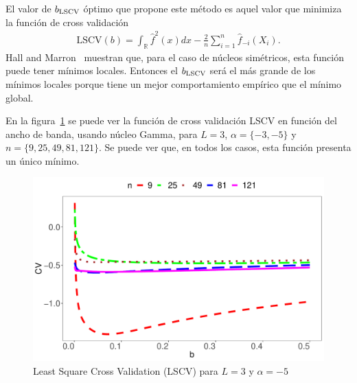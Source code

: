 El valor de $b_{\tiny \text{LSCV}}$ óptimo que propone este método es aquel valor que minimiza la función de cross validación 
\begin{align}
\label{LSCV}
	\text{LSCV}(b)=\int_\mathbb{R} \widehat{f}^2(x)dx - \frac{2}{n}\sum_{i=1}^n \widehat{f}_{-i}(X_i).
\end{align}
Hall and Marron~\cite{HallMarron1991} muestran que, para el caso de núcleos simétricos, esta función puede tener mínimos locales. Entonces el  $b_{\tiny \text{LSCV}}$ será el más grande de los mínimos locales porque tiene un mejor comportamiento empírico que el mínimo global.

En la figura~\ref{LSCVgraf} se puede ver la función de cross validación LSCV en función del ancho de banda, usando núcleo Gamma, para $L=3$, $\alpha=\{-3,-5\}$ y $n=\{9,25,49,81,121\}$. Se puede ver que, en todos los casos, esta función presenta un único mínimo.

\begin{figure}[hbt]
	\centering 
	\includegraphics[scale=0.5]{../../Figures/Tesis/Capitulo5/GraficoLSCValfa=-5.pdf}
	\caption{\label{LSCVgraf} Least Square Cross Validation (LSCV) para $L=3$ y $\alpha=-5$}
\end{figure}



